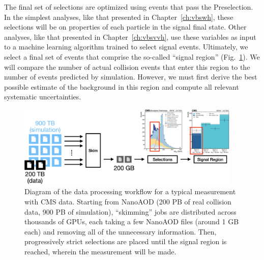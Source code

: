 The final set of selections are optimized using events that pass the Preselection. 
In the simplest analyses, like that presented in Chapter~\ref{ch:vbswh}, these selections will be on properties of each particle in the signal final state. 
Other analyses, like that presented in Chapter~\ref{ch:vbsvvh}, use these variables as input to a machine learning algorithm trained to select signal events. 
Ultimately, we select a final set of events that comprise the so-called ``signal region'' (Fig.~\ref{fig:nano_to_SR}). 
We will compare the number of actual collision events that enter this region to the number of events predicted by simulation. 
However, we must first derive the best possible estimate of the background in this region and compute all relevant systematic uncertainties. 

\begin{figure}[htb]
    \centering
    \includegraphics[width=0.95\textwidth]{fig/cms/nano_to_SR.png}
    \caption[Diagram of the data processing workflow for a typical measurement with CMS data]{
        Diagram of the data processing workflow for a typical measurement with CMS data. 
        Starting from NanoAOD (200 PB of real collision data, 900 PB of simulation), ``skimming'' jobs are distributed across thousands of GPUs, each taking a few NanoAOD files (around 1 GB each) and removing all of the unnecessary information. 
        Then, progressively strict selections are placed until the signal region is reached, wherein the measurement will be made. 
    }
    \label{fig:nano_to_SR}
\end{figure}

